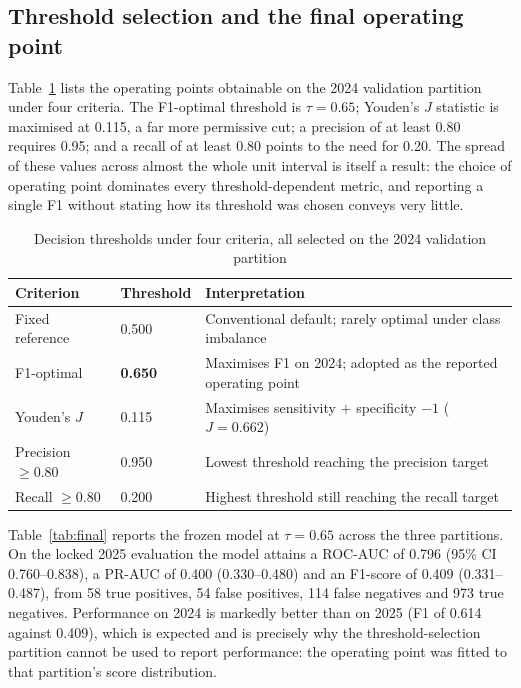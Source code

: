 \documentclass[sn-vancouver,Numbered]{sn-jnl}
\begin{document}
\subsection{Threshold selection and the final operating point}

Table~\ref{tab:thresholds} lists the operating points obtainable on the 2024 validation partition under four criteria. The F1-optimal threshold is $\tau = 0.65$; Youden's $J$ statistic is maximised at 0.115, a far more permissive cut; a precision of at least 0.80 requires 0.95; and a recall of at least 0.80 points to the need for 0.20. The spread of these values across almost the whole unit interval is itself a result: the choice of operating point dominates every threshold-dependent metric, and reporting a single F1 without stating how its threshold was chosen conveys very little.

\begin{table}[h]
\caption{Decision thresholds under four criteria, all selected on the 2024 validation partition}\label{tab:thresholds}
\begin{tabular}{llp{7.2cm}}
\toprule
Criterion & Threshold & Interpretation \\
\midrule
Fixed reference & 0.500 & Conventional default; rarely optimal under class imbalance \\
F1-optimal & \textbf{0.650} & Maximises F1 on 2024; adopted as the reported operating point \\
Youden's $J$ & 0.115 & Maximises sensitivity $+$ specificity $-1$ ($J = 0.662$) \\
Precision $\geq 0.80$ & 0.950 & Lowest threshold reaching the precision target \\
Recall $\geq 0.80$ & 0.200 & Highest threshold still reaching the recall target \\
\bottomrule
\end{tabular}
\end{table}

Table~\ref{tab:final} reports the frozen model at $\tau = 0.65$ across the three partitions. On the locked 2025 evaluation the model attains a ROC-AUC of 0.796 (95\% CI 0.760--0.838), a PR-AUC of 0.400 (0.330--0.480) and an F1-score of 0.409 (0.331--0.487), from 58 true positives, 54 false positives, 114 false negatives and 973 true negatives. Performance on 2024 is markedly better than on 2025 (F1 of 0.614 against 0.409), which is expected and is precisely why the threshold-selection partition cannot be used to report performance: the operating point was fitted to that partition's score distribution.
\end{document}

